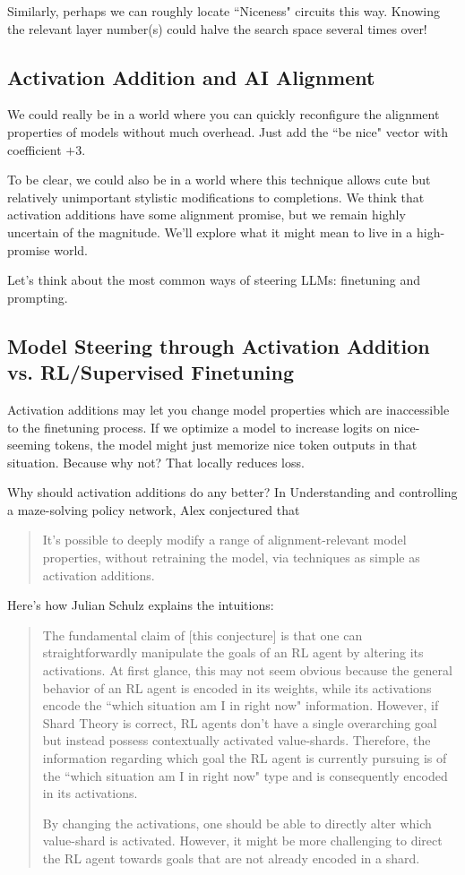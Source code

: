 \documentclass[10pt]{article}
\begin{document}
Similarly, perhaps we can roughly locate ``Niceness" circuits this way. Knowing the relevant layer number(s) could halve the search space several times over!

\subsection{Activation Addition and AI Alignment}
We could really be in a world where you can quickly reconfigure the alignment properties of models without much overhead. Just add the ``be nice" vector with coefficient $+$3. 

To be clear, we could also be in a world where this technique allows cute but relatively unimportant stylistic modifications to completions. We think that activation additions have some alignment promise, but we remain highly uncertain of the magnitude. We'll explore what it might mean to live in a high-promise world.

Let's think about the most common ways of steering LLMs: finetuning and prompting. 

\subsection{Model Steering through Activation Addition vs. RL/Supervised Finetuning}
Activation additions may let you change model properties which are inaccessible to the finetuning process. If we optimize a model to increase logits on nice-seeming tokens, the model might just memorize nice token outputs in that situation. Because why not? That locally reduces loss. 

Why should activation additions do any better? In Understanding and controlling a maze-solving policy network, Alex conjectured that

\begin{quote}
It's possible to deeply modify a range of alignment-relevant model properties, without retraining the model, via techniques as simple as activation additions.
\end{quote}

Here's how Julian Schulz explains the intuitions:

\begin{quote}
The fundamental claim of [this conjecture] is that one can straightforwardly manipulate the goals of an RL agent by altering its activations. At first glance, this may not seem obvious because the general behavior of an RL agent is encoded in its weights, while its activations encode the ``which situation am I in right now" information. However, if Shard Theory is correct, RL agents don't have a single overarching goal but instead possess contextually activated value-shards. Therefore, the information regarding which goal the RL agent is currently pursuing is of the ``which situation am I in right now" type and is consequently encoded in its activations.

By changing the activations, one should be able to directly alter which value-shard is activated. However, it might be more challenging to direct the RL agent towards goals that are not already encoded in a shard.
\end{quote}
\end{document}

